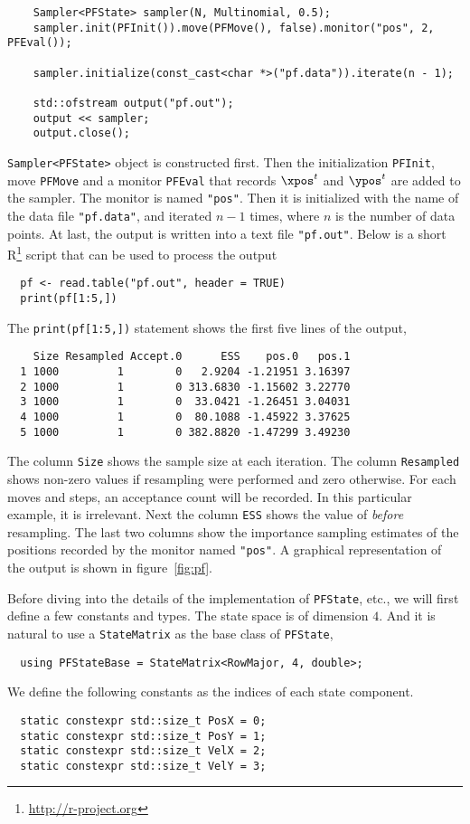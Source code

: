 \begin{Verbatim}
    Sampler<PFState> sampler(N, Multinomial, 0.5);
    sampler.init(PFInit()).move(PFMove(), false).monitor("pos", 2, PFEval());

    sampler.initialize(const_cast<char *>("pf.data")).iterate(n - 1);

    std::ofstream output("pf.out");
    output << sampler;
    output.close();
\end{Verbatim}
\verb|Sampler<PFState>| object is constructed first. Then the initialization
\verb|PFInit|, move \verb|PFMove| and a monitor \verb|PFEval| that records
$\xpos^t$ and $\ypos^t$ are added to the sampler. The monitor is named
\verb|"pos"|. Then it is initialized with the name of the data file
\verb|"pf.data"|, and iterated $n - 1$ times, where $n$ is the number of data
points. At last, the output is written into a text file \verb|"pf.out"|. Below
is a short R\footnote{\url{http://r-project.org}} script that can be used to
process the output
\begin{Verbatim}
  pf <- read.table("pf.out", header = TRUE)
  print(pf[1:5,])
\end{Verbatim}
The \verb|print(pf[1:5,])| statement shows the first five lines of the output,
\begin{Verbatim}
    Size Resampled Accept.0      ESS    pos.0   pos.1
  1 1000         1        0   2.9204 -1.21951 3.16397
  2 1000         1        0 313.6830 -1.15602 3.22770
  3 1000         1        0  33.0421 -1.26451 3.04031
  4 1000         1        0  80.1088 -1.45922 3.37625
  5 1000         1        0 382.8820 -1.47299 3.49230
\end{Verbatim}
The column \verb|Size| shows the sample size at each iteration. The column
\verb|Resampled| shows non-zero values if resampling were performed and zero
otherwise. For each moves and \mcmc steps, an acceptance count will be
recorded. In this particular example, it is irrelevant. Next the column
\verb|ESS| shows the value of \ess \emph{before} resampling. The last two
columns show the importance sampling estimates of the positions recorded by the
monitor named \verb|"pos"|. A graphical representation of the output is shown
in figure~\ref{fig:pf}.

Before diving into the details of the implementation of \verb|PFState|, etc.,
we will first define a few constants and types. The state space is of dimension
$4$. And it is natural to use a \verb|StateMatrix| as the base class of
\verb|PFState|,
\begin{Verbatim}
  using PFStateBase = StateMatrix<RowMajor, 4, double>;
\end{Verbatim}
We define the following constants as the indices of each state component.
\begin{Verbatim}
  static constexpr std::size_t PosX = 0;
  static constexpr std::size_t PosY = 1;
  static constexpr std::size_t VelX = 2;
  static constexpr std::size_t VelY = 3;
\end{Verbatim}

